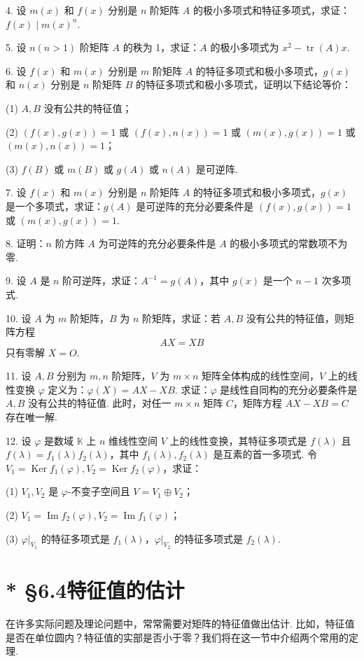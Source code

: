 \documentclass[UTF8, 12pt, fontset=fandol, oneside]{ctexart}
\begin{document}
4. 设 $m(x)$ 和 $f(x)$ 分别是 $n$ 阶矩阵 $A$ 的极小多项式和特征多项式，求证：$f(x)\mid m(x)^n$.

5. 设 $n(n>1)$ 阶矩阵 $A$ 的秩为 1，求证：$A$ 的极小多项式为 $x^2-\operatorname{tr}(A)x$.

6. 设 $f(x)$ 和 $m(x)$ 分别是 $m$ 阶矩阵 $A$ 的特征多项式和极小多项式，$g(x)$ 和 $n(x)$ 分别是 $n$ 阶矩阵 $B$ 的特征多项式和极小多项式，证明以下结论等价：

(1) $A,B$ 没有公共的特征值；

(2) $(f(x),g(x))=1$ 或 $(f(x),n(x))=1$ 或 $(m(x),g(x))=1$ 或 $(m(x),n(x))=1$；

(3) $f(B)$ 或 $m(B)$ 或 $g(A)$ 或 $n(A)$ 是可逆阵.

7. 设 $f(x)$ 和 $m(x)$ 分别是 $n$ 阶矩阵 $A$ 的特征多项式和极小多项式，$g(x)$ 是一个多项式，求证：$g(A)$ 是可逆阵的充分必要条件是 $(f(x),g(x))=1$ 或 $(m(x),g(x))=1$.

8. 证明：$n$ 阶方阵 $A$ 为可逆阵的充分必要条件是 $A$ 的极小多项式的常数项不为零.

9. 设 $A$ 是 $n$ 阶可逆阵，求证：$A^{-1}=g(A)$，其中 $g(x)$ 是一个 $n-1$ 次多项式.

10. 设 $A$ 为 $m$ 阶矩阵，$B$ 为 $n$ 阶矩阵，求证：若 $A,B$ 没有公共的特征值，则矩阵方程
\[
AX=XB
\]
只有零解 $X=O$.

11. 设 $A,B$ 分别为 $m,n$ 阶矩阵，$V$ 为 $m\times n$ 矩阵全体构成的线性空间，$V$ 上的线性变换 $\varphi$ 定义为：$\varphi(X)=AX-XB$. 求证：$\varphi$ 是线性自同构的充分必要条件是 $A,B$ 没有公共的特征值. 此时，对任一 $m\times n$ 矩阵 $C$，矩阵方程 $AX-XB=C$ 存在唯一解.

12. 设 $\varphi$ 是数域 $\mathbb{K}$ 上 $n$ 维线性空间 $V$ 上的线性变换，其特征多项式是 $f(\lambda)$ 且 $f(\lambda)=f_1(\lambda)f_2(\lambda)$，其中 $f_1(\lambda),f_2(\lambda)$ 是互素的首一多项式. 令 $V_1=\operatorname{Ker}f_1(\varphi),V_2=\operatorname{Ker}f_2(\varphi)$，求证：

(1) $V_1,V_2$ 是 $\varphi$-不变子空间且 $V=V_1\oplus V_2$；

(2) $V_1=\operatorname{Im}f_2(\varphi),V_2=\operatorname{Im}f_1(\varphi)$；

(3) $\varphi|_{V_1}$ 的特征多项式是 $f_1(\lambda)$，$\varphi|_{V_2}$ 的特征多项式是 $f_2(\lambda)$.

\section*{* §6.4\quad 特征值的估计}

在许多实际问题及理论问题中，常常需要对矩阵的特征值做出估计. 比如，特征值是否在单位圆内？特征值的实部是否小于零？我们将在这一节中介绍两个常用的定理.
\end{document}
